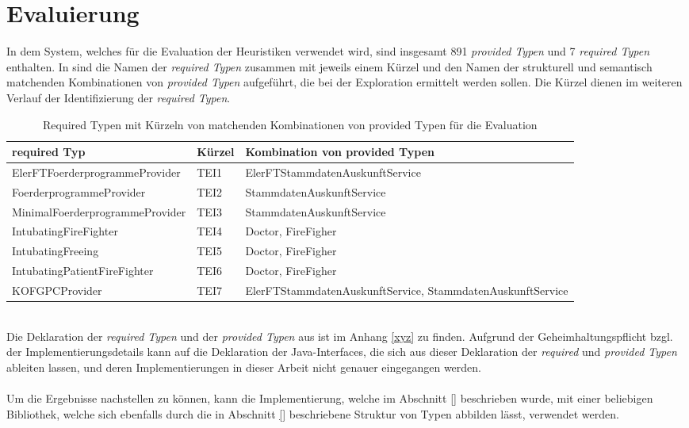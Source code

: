 \chapter{Evaluierung}\label{chap_evaluation}
In dem System, welches für die Evaluation der Heuristiken verwendet wird, sind insgesamt 891 \emph{provided Typen} und 7 \emph{required Typen} enthalten. In  sind die Namen der \emph{required Typen} zusammen mit jeweils einem Kürzel und den Namen der strukturell und semantisch matchenden Kombinationen von \emph{provided Typen} aufgeführt, die bei der Exploration ermittelt werden sollen. Die Kürzel dienen im weiteren Verlauf der Identifizierung der \emph{required Typen}.
\begin{table}[h!]
\centering
\small
\begin{tabular}{|p{6cm}|p{1.5cm}|p{6.5cm}|}
\hline
\hline
\centering\textbf{required Typ} & \textbf{Kürzel} & \textbf{Kombination von provided Typen}\\
\hline
\hline
ElerFTFoerderprogrammeProvider & TEI1 & ElerFTStammdatenAuskunftService\\
\hline
FoerderprogrammeProvider & TEI2 & StammdatenAuskunftService\\
\hline
MinimalFoerderprogrammeProvider & TEI3 & StammdatenAuskunftService\\
\hline
IntubatingFireFighter & TEI4 & Doctor, FireFigher\\
\hline
IntubatingFreeing & TEI5 & Doctor, FireFigher\\
\hline
IntubatingPatientFireFighter & TEI6 & Doctor, FireFigher\\
\hline
KOFGPCProvider & TEI7 & ElerFTStammdatenAuskunftService, StammdatenAuskunftService\\
\hline
\hline
\end{tabular}
\caption{Required Typen mit Kürzeln von matchenden Kombinationen von provided Typen für die Evaluation}
 \label{tab:eIShort}
\end{table}
\noindent
\\
Die Deklaration der \emph{required Typen} und der \emph{provided Typen} aus  ist im Anhang \ref{xyz} zu finden. Aufgrund der Geheimhaltungspflicht bzgl. der Implementierungsdetails kann auf die Deklaration der Java-Interfaces, die sich aus dieser Deklaration der \emph{required} und \emph{provided Typen} ableiten lassen, und deren Implementierungen in dieser Arbeit nicht genauer eingegangen werden.
\\\\
Um die Ergebnisse nachstellen zu können, kann die Implementierung, welche im Abschnitt \ref{} beschrieben wurde, mit einer beliebigen Bibliothek, welche sich ebenfalls durch die in Abschnitt \ref{} beschriebene Struktur von Typen abbilden lässt, verwendet werden.

